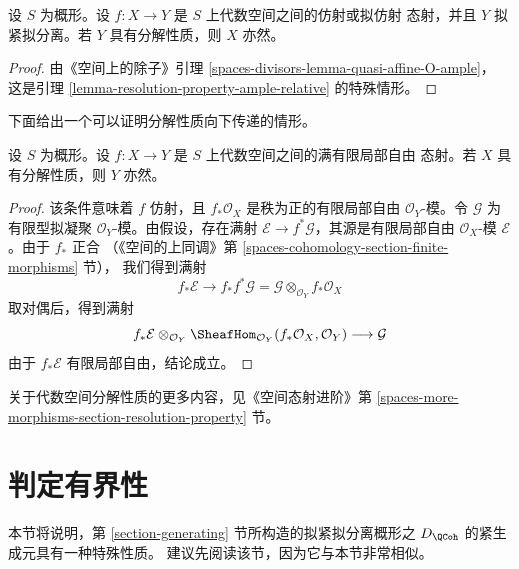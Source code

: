 \begin{lemma}
\label{lemma-resolution-property-goes-up-affine}
设 $S$ 为概形。设 $f : X \to Y$ 是 $S$ 上代数空间之间的仿射或拟仿射
态射，并且 $Y$ 拟紧拟分离。若 $Y$ 具有分解性质，则 $X$ 亦然。
\end{lemma}

\begin{proof}
由《空间上的除子》引理
\ref{spaces-divisors-lemma-quasi-affine-O-ample}，
这是引理 \ref{lemma-resolution-property-ample-relative} 的特殊情形。
\end{proof}

\noindent
下面给出一个可以证明分解性质向下传递的情形。

\begin{lemma}
\label{lemma-resolution-property-goes-down-finite-flat}
设 $S$ 为概形。设 $f : X \to Y$ 是 $S$ 上代数空间之间的满有限局部自由
态射。若 $X$ 具有分解性质，则 $Y$ 亦然。
\end{lemma}

\begin{proof}
该条件意味着 $f$ 仿射，且 $f_*\mathcal{O}_X$ 是秩为正的有限局部自由
$\mathcal{O}_Y$-模。令 $\mathcal{G}$ 为有限型拟凝聚
$\mathcal{O}_Y$-模。由假设，存在满射
$\mathcal{E} \to f^*\mathcal{G}$，其源是有限局部自由
$\mathcal{O}_X$-模 $\mathcal{E}$。由于 $f_*$ 正合
（《空间的上同调》第 \ref{spaces-cohomology-section-finite-morphisms} 节），
我们得到满射
$$
f_*\mathcal{E}
\longrightarrow
f_*f^*\mathcal{G} = \mathcal{G} \otimes_{\mathcal{O}_Y} f_*\mathcal{O}_X
$$
取对偶后，得到满射 %
$$
f_*\mathcal{E}
\otimes_{\mathcal{O}_Y}
\SheafHom_{\mathcal{O}_Y}(f_*\mathcal{O}_X, \mathcal{O}_Y)
\longrightarrow
\mathcal{G}
$$
由于 $f_*\mathcal{E}$ 有限局部自由，结论成立。
\end{proof}

\noindent
关于代数空间分解性质的更多内容，见《空间态射进阶》第
\ref{spaces-more-morphisms-section-resolution-property} 节。













\section{判定有界性}
\label{section-detecting-boundedness}

\noindent
本节将说明，第 \ref{section-generating} 节所构造的拟紧拟分离概形之
$D_\QCoh$ 的紧生成元具有一种特殊性质。%
建议先阅读该节，因为它与本节非常相似。

